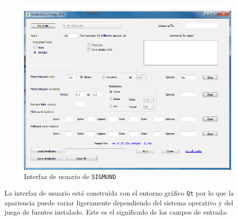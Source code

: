 \begin{figure}[h!]
\centering
\includegraphics[scale=1]{ManFigs/sigmund_ui.png}
\caption{Interfaz de usuario de \texttt{SIGMUND} }
\label{fig:ASIGMUNDMAN_matricessim}
\end{figure}

La interfaz de usuario está construida con el entorno gráfico \texttt{Qt} por lo que la apariencia puede variar ligeramente dependiendo del sistema operativo y del juego de fuentes instalado. Este es el significado de los campos de entrada:

